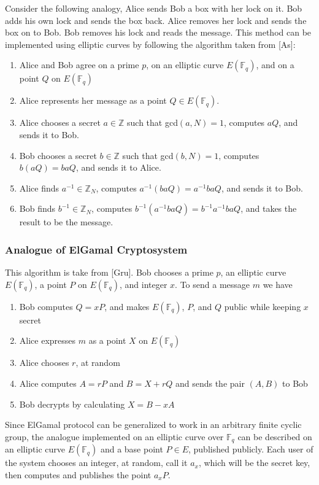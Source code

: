\documentclass[12pt]{article}
\newcommand{\F}{\mathbb{F}}
\newcommand{\Z}{\mathbb{Z}}
\begin{document}
Consider the following analogy, Alice sends Bob a box with her lock on it. Bob adds his own lock and sends the box back. Alice removes her lock and sends the box on to Bob. Bob removes his lock and reads the message. This method can be implemented using elliptic curves by following the algorithm taken from [As]:

\begin{enumerate}
\item Alice and Bob agree on a prime $p$, on an elliptic curve $E(\F_q)$, and on a point $Q$ on $E(\F_q)$
\item Alice represents her message as a point $Q \in E(\F_q)$. 
\item Alice chooses a secret $a \in \Z$ such that gcd$(a,N) =1$, computes $aQ$, and sends it to Bob.
\item Bob chooses a secret $b \in \Z$ such that gcd$(b,N)=1$, computes $b(aQ) = baQ$, and sends it to Alice.
\item Alice finds $a^{-1} \in \Z_N$, computes $a^{-1}(baQ) = a^{-1}baQ$, and sends it to Bob. 
\item Bob finds $b^{-1} \in \Z_N$, computes $b^{-1}(a^{-1}baQ) = b^{-1}a^{-1}baQ$, and takes the result to be the message.
\end{enumerate}

\subsubsection{Analogue of ElGamal Cryptosystem}

This algorithm is take from [Gru]. Bob chooses a prime $p$, an elliptic curve $E(\F_q)$, a point $P$ on $E(\F_q)$, and integer $x$. To send a message $m$ we have

\begin{enumerate}
\item Bob computes $Q = xP$, and makes $E(\F_q)$, $P$, and $Q$ public while keeping $x$ secret
\item Alice expresses $m$ as a point $X$ on $E(\F_q)$
\item Alice chooses $r$, at random
\item Alice computes $A = rP$ and $B=X+rQ$ and sends the pair $(A,B)$ to Bob
\item Bob decrypts by calculating $X = B-xA$
\end{enumerate}

Since ElGamal protocol can be generalized to work in an arbitrary finite cyclic group, the analogue implemented on an elliptic curve over $\F_q$ can be described on an elliptic curve $E(\F_q)$ and a base point $P \in E$, published publicly. Each user of the system chooses an integer, at random, call it $a_x$, which will be the secret key, then computes and publishes the point $a_xP$. \\
\end{document}
